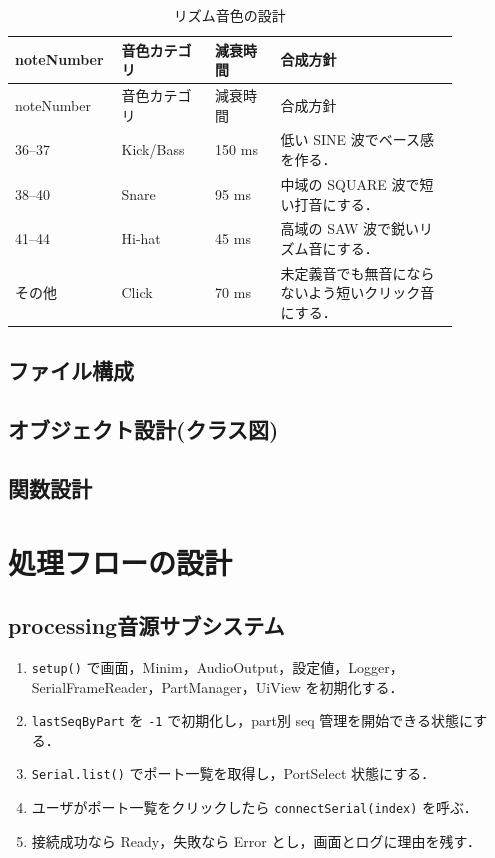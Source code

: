 \documentclass[lualatex,book,paper=a4paper,jafontsize=11.5pt,jafontscale=1.05]{jlreq}
\begin{document}
\begin{longtable}{p{0.16\linewidth}p{0.20\linewidth}p{0.14\linewidth}p{0.38\linewidth}}
\caption{リズム音色の設計}\label{tab:rhythm}\\
\toprule
noteNumber & 音色カテゴリ & 減衰時間 & 合成方針 \\
\midrule
\endfirsthead
\toprule
noteNumber & 音色カテゴリ & 減衰時間 & 合成方針 \\
\midrule
\endhead
36--37 & Kick/Bass & 150 ms & 低い SINE 波でベース感を作る． \\
38--40 & Snare & 95 ms & 中域の SQUARE 波で短い打音にする． \\
41--44 & Hi-hat & 45 ms & 高域の SAW 波で鋭いリズム音にする． \\
その他 & Click & 70 ms & 未定義音でも無音にならないよう短いクリック音にする． \\
\bottomrule
\end{longtable}

\subsection{ファイル構成}

\subsection{オブジェクト設計(クラス図)}

\subsection{関数設計}


\section{処理フローの設計}
\subsection{processing音源サブシステム}
\begin{enumerate}
  \item \texttt{setup()} で画面，Minim，AudioOutput，設定値，Logger，SerialFrameReader，PartManager，UiView を初期化する．
  \item \texttt{lastSeqByPart} を \texttt{-1} で初期化し，part別 seq 管理を開始できる状態にする．
  \item \texttt{Serial.list()} でポート一覧を取得し，PortSelect 状態にする．
  \item ユーザがポート一覧をクリックしたら \texttt{connectSerial(index)} を呼ぶ．
  \item 接続成功なら Ready，失敗なら Error とし，画面とログに理由を残す．
\end{enumerate}
\end{document}
